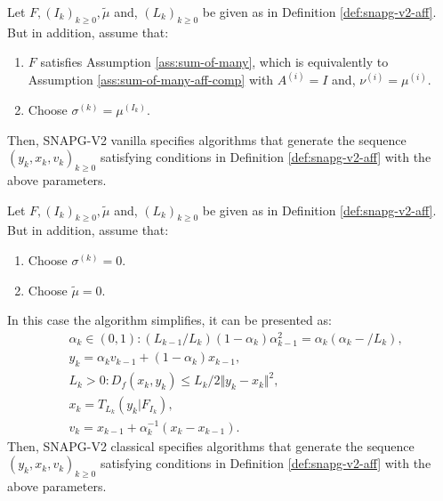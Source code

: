 \documentclass[12pt]{article}
\begin{document}
    \begin{definition}\label{def:snapg-v2}
        Let $F, (I_k)_{k \ge 0}, \tilde \mu$ and, $(L_k)_{k \ge 0}$ be given as in Definition \ref{def:snapg-v2-aff}. 
        But in addition, assume that: 
        \begin{enumerate}[nosep]
            \item $F$ satisfies Assumption \ref{ass:sum-of-many}, which is equivalently to Assumption \ref{ass:sum-of-many-aff-comp} with $A^{(i)} = I$ and, $\nu^{(i)} = \mu^{(i)}$. 
            \item Choose $\sigma^{(k)} = \mu^{(I_k)}$. 
        \end{enumerate}
        Then, SNAPG-V2 vanilla specifies algorithms that generate the sequence $(y_k, x_k, v_k)_{k \ge 0}$ satisfying conditions in Definition \ref{def:snapg-v2-aff} with the above parameters. 
    \end{definition}
    \begin{definition}\label{def:snapg-v2-classical}
        Let $F, (I_k)_{k \ge 0}, \tilde \mu$ and, $(L_k)_{k \ge 0}$ be given as in Definition \ref{def:snapg-v2-aff}. 
        But in addition, assume that: 
        \begin{enumerate}[nosep]
            \item Choose $\sigma^{(k)} = 0$. 
            \item Choose $\tilde \mu = 0$. 
        \end{enumerate}
        In this case the algorithm simplifies, it can be presented as: 
        \begin{align*}
            & \alpha_k \in (0, 1): (L_{k - 1}/L_k)(1 - \alpha_{k})\alpha_{k - 1}^2 = \alpha_{k}\left(\alpha_{k} - /L_k\right), \\
            & y_k = \alpha_k v_{k - 1} + (1 - \alpha_k)x_{k - 1}, \\
            & L_k > 0: D_f(x_k, y_k) \le L_k/2\Vert y_k - x_k\Vert^2, \\
            & x_k =  T_{L_k}(y_k | F_{I_k}), \\
            & v_k = x_{k - 1} + \alpha_k^{-1}(x_k - x_{k - 1}). 
        \end{align*}
        Then, SNAPG-V2 classical specifies algorithms that generate the sequence $(y_k, x_k, v_k)_{k \ge 0}$ satisfying conditions in Definition \ref{def:snapg-v2-aff} with the above parameters. 
    \end{definition}
\end{document}
